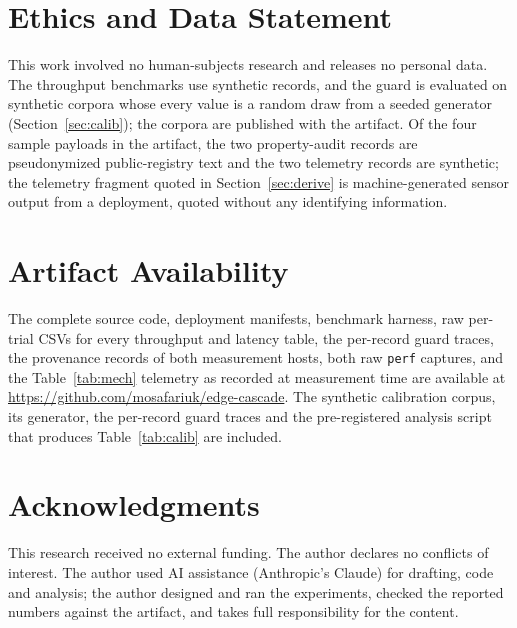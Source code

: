 \documentclass[conference]{IEEEtran}
\begin{document}
\section*{Ethics and Data Statement}
This work involved no human-subjects research and releases no personal data. The throughput benchmarks use synthetic records, and the guard is evaluated on synthetic corpora whose every value is a random draw from a seeded generator (Section~\ref{sec:calib}); the corpora are published with the artifact. Of the four sample payloads in the artifact, the two property-audit records are pseudonymized public-registry text and the two telemetry records are synthetic; the telemetry fragment quoted in Section~\ref{sec:derive} is machine-generated sensor output from a deployment, quoted without any identifying information.

\section*{Artifact Availability}
The complete source code, deployment manifests, benchmark harness, raw per-trial CSVs for every throughput and latency table, the per-record guard traces, the provenance records of both measurement hosts, both raw \texttt{perf} captures, and the Table~\ref{tab:mech} telemetry as recorded at measurement time are available at \url{https://github.com/mosafariuk/edge-cascade}. The synthetic calibration corpus, its generator, the per-record guard traces and the pre-registered analysis script that produces Table~\ref{tab:calib} are included.

\section*{Acknowledgments}
This research received no external funding. The author declares no conflicts of interest. The author used AI assistance (Anthropic's Claude) for drafting, code and analysis; the author designed and ran the experiments, checked the reported numbers against the artifact, and takes full responsibility for the content.
\end{document}
